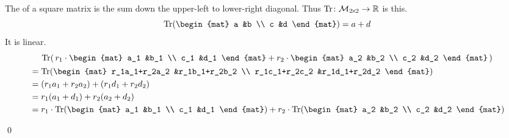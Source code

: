 \documentclass[10pt,t]{beamer}
\begin{document}
\begin{frame}
\ex
The  of a square matrix 
is the sum down the upper-left to lower-right diagonal.
Thus
$\mbox{$\operatorname{Tr}\colon \mathcal{M}_{2 \! \times \! 2}\to \mathbb{R}$}$
is this.
\begin{equation*}
  \trace(\begin{mat}
    a &b \\
    c &d
  \end{mat})
  =a+d
\end{equation*}
It is linear.
\begin{multline*}
  \trace(\,
  r_1\cdot\begin{mat}
    a_1 &b_1 \\
    c_1 &d_1
  \end{mat}
  +
  r_2\cdot\begin{mat}
    a_2 &b_2 \\
    c_2 &d_2
  \end{mat}
  \,)                                              \\
  \begin{aligned}
    &=\trace(
      \begin{mat}
        r_1a_1+r_2a_2 &r_1b_1+r_2b_2 \\
        r_1c_1+r_2c_2 &r_1d_1+r_2d_2
      \end{mat}
      )                                       \\
    &=(r_1a_1+r_2a_2)+(r_1d_1+r_2d_2)         \\
    &=r_1(a_1+d_1)+r_2(a_2+d_2)               \\
    &=r_1\cdot\trace(
      \begin{mat}
        a_1 &b_1 \\
        c_1 &d_1
      \end{mat}
      )
      +
      r_2\cdot\trace(
      \begin{mat}
        a_2 &b_2 \\
        c_2 &d_2
      \end{mat}
      )
  \end{aligned} 
\end{multline*}
\end{frame}



\begin{frame}
\th[th:HomoDetActOnBasis]

\pause
\pf
{}

\pause
{}
\end{frame}
\begin{frame}
\qed

\pause %
\df[df:ExtendedLinearly]
\end{frame}
\end{document}
